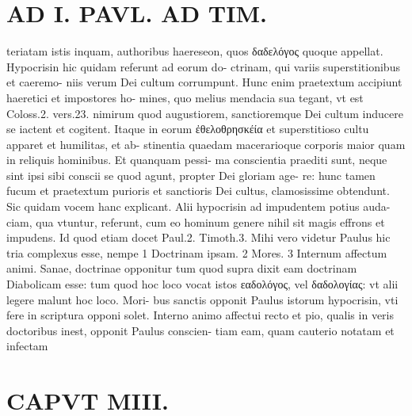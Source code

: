 \documentclass{article}
\begin{document}
\begin{pages}
\section*{AD I. PAVL. AD TIM. }
\marginpar{[ p.184 ]}\pstart teriatam istis inquam, authoribus haereseon, quos δαδελόγος quoque appellat. Hypocrisin hic quidam referunt ad eorum do- ctrinam, qui variis superstitionibus et caeremo- niis verum Dei cultum corrumpunt. Hunc enim praetextum accipiunt haeretici et impostores ho- mines, quo melius mendacia sua tegant, vt est Coloss.2. vers.23. nimirum quod augustiorem, sanctioremque Dei cultum inducere se iactent et cogitent. Itaque in eorum ἐθελοθρησκέία et superstitioso cultu apparet et humilitas, et ab- stinentia quaedam macerarioque corporis maior quam in reliquis hominibus. Et quanquam pessi- ma conscientia praediti sunt, neque sint ipsi sibi conscii se quod agunt, propter Dei gloriam age- re: hunc tamen fucum et praetextum purioris et sanctioris Dei cultus, clamosissime obtendunt. Sic quidam vocem hanc explicant. Alii hypocrisin ad impudentem potius auda- ciam, qua vtuntur, referunt, cum eo hominum genere nihil sit magis effrons et impudens. Id quod etiam docet Paul.2. Timoth.3. Mihi vero videtur Paulus hic tria complexus esse, nempe 1 Doctrinam ipsam. 2 Mores. 3 Internum affectum animi. Sanae, doctrinae opponitur tum quod supra dixit eam doctrinam Diabolicam esse: tum quod hoc loco vocat istos εαδολόγος, vel δαδολογίας: vt alii legere malunt hoc loco. Mori- bus sanctis opponit Paulus istorum hypocrisin, vti fere in scriptura opponi solet. Interno animo affectui recto et pio, qualis in veris doctoribus inest, opponit Paulus conscien- tiam eam, quam cauterio notatam et infectam  \pend
\section*{CAPVT  MIII. }
\marginpar{[ p.185 ]}\pstart {}
{}

\end{pages}
\end{document}
